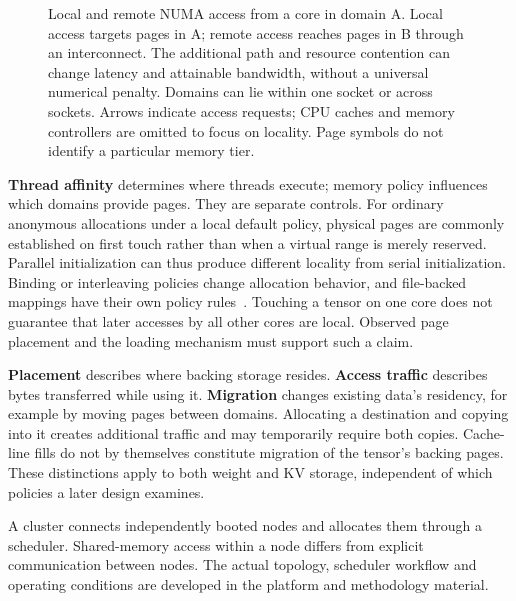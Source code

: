 \begin{figure}[htbp]
\centering

\caption{Local and remote NUMA access from a core in domain A.  Local
access targets pages in A; remote access reaches pages in B through an
interconnect.  The additional path and resource contention can change
latency and attainable bandwidth, without a universal numerical penalty.
Domains can lie within one socket or across sockets.  Arrows indicate
access requests; CPU caches and memory controllers are omitted to focus
on locality.  Page symbols do not identify a particular memory tier.}
\label{fig:numa-access-paths}
\end{figure}
\FloatBarrier

\textbf{Thread affinity} determines where threads execute; memory policy
influences which domains provide pages.  They are separate controls.
For ordinary anonymous allocations under a local default policy,
physical pages are commonly established on first touch rather than when
a virtual range is merely reserved.  Parallel initialization can thus
produce different locality from serial initialization.  Binding or
interleaving policies change allocation behavior, and file-backed mappings
have their own policy rules~\cite{linuxnumapolicy2026}.  Touching a tensor
on one core does not guarantee that later accesses by all other cores
are local.  Observed page placement and the loading mechanism must
support such a claim.

\textbf{Placement} describes where backing storage resides.
\textbf{Access traffic} describes bytes transferred while using it.
\textbf{Migration} changes existing data's residency, for example by
moving pages between domains.  Allocating a destination and copying
into it creates additional traffic and may temporarily require both
copies.  Cache-line fills do not by themselves constitute migration of
the tensor's backing pages.  These distinctions apply to both weight
and KV storage, independent of which policies a later design examines.

A cluster connects independently booted nodes and allocates them
through a scheduler.  Shared-memory access within a node differs from
explicit communication between nodes.  The actual topology, scheduler
workflow and operating conditions are developed in the platform and
methodology material.
\FloatBarrier
